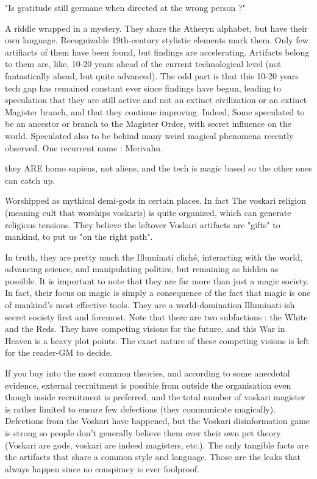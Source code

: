 \begin{rpg-quotebox}
	"Is gratitude still germane when directed at the wrong person ?"
\end{rpg-quotebox}

A riddle wrapped in a mystery. They share the Atheryn alphabet, but have their own language. Recognizable 19th-century stylistic elements mark them. Only few artifiacts of them have been found, but findings are accelerating. Artifacts belong to them are, like, 10-20 years ahead of the current technological level (not fantastically ahead, but quite advanced). The odd part is that this 10-20 years tech gap has remained constant ever since findings have begun, leading to speculation that they are still active and not an extinct civilization or an extinct Magister branch, and that they continue improving. Indeed, Some speculated to be an ancestor or branch to the Magister Order, with secret influence on the world. Speculated also to be behind many weird magical phenomena recently observed. One recurrent name : Merivahn.

they ARE homo sapiens, not aliens, and the tech is magic based so the other ones can catch up.
	
Worshipped as mythical demi-gods in certain places. In fact The voskari religion (meaning cult that worships voskaris) is quite organized, which can generate religious tensions. They believe the leftover Voskari artifacts are "gifts" to mankind, to put us "on the right path". 

In truth, they are pretty much the Illuminati cliché, interacting with the world, advancing science, and manipulating politics, but remaining as hidden as possible. It is important to note that they are far more than just a magic society. In fact, their focus on magic is simply a consequence of the fact that magic is one of mankind's most effective tools. They are a world-domination Illuminati-ish secret society first and foremost.
    Note that there are two subfactions : the White and the Reds. They have competing visions for the future, and this War in Heaven is a heavy plot points. The exact nature of these competing visions is left for the reader-GM to decide.

If you buy into the most common theories, and according to some anecdotal evidence, external recruitment is possible from outside the organisation even though inside recruitment is preferred, and the total number of voskari magister is rather limited to ensure few defections (they communicate magically). Defections from the Voskari have happened, but the Voskari disinformation game is strong so people don't generally believe them over their own pet theory (Voskari are gods, voskari are indeed magisters, etc.). The only tangible facts are the artifacts that share a common style and language. Those are the leaks that always happen since no conspiracy is ever foolproof.





